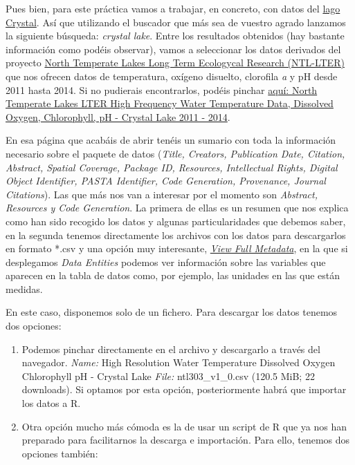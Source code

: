 \documentclass[
]{book}
\providecommand{\tightlist}{%
  \setlength{\itemsep}{0pt}\setlength{\parskip}{0pt}}
\begin{document}
Pues bien, para este práctica vamos a trabajar, en concreto, con datos del \href{https://lter.limnology.wisc.edu/researchsite/crystal-lake}{lago Crystal}.
Así que utilizando el buscador que más sea de vuestro agrado lanzamos la siguiente búsqueda: \emph{crystal lake}.
Entre los resultados obtenidos (hay bastante información como podéis observar), vamos a seleccionar los datos derivados del proyecto \href{https://lter.limnology.wisc.edu/index.php/}{North Temperate Lakes Long Term Ecologycal Research (NTL-LTER)} que nos ofrecen datos de temperatura, oxígeno disuelto, clorofila \emph{a} y pH desde 2011 hasta 2014. Si no pudierais encontrarlos, podéis pinchar \href{https://portal.edirepository.org/nis/mapbrowse?packageid=knb-lter-ntl.303.20}{aquí: North Temperate Lakes LTER High Frequency Water Temperature Data, Dissolved Oxygen, Chlorophyll, pH - Crystal Lake 2011 - 2014}.

En esa página que acabáis de abrir tenéis un sumario con toda la información necesario sobre el paquete de datos (\emph{Title, Creators, Publication Date, Citation, Abstract, Spatial Coverage, Package ID, Resources, Intellectual Rights, Digital Object Identifier, PASTA Identifier, Code Generation, Provenance, Journal Citations}). Las que más nos van a interesar por el momento son \emph{Abstract, Resources y Code Generation}. La primera de ellas es un resumen que nos explica como han sido recogido los datos y algunas particularidades que debemos saber, en la segunda tenemos directamente los archivos con los datos para descargarlos en formato *.csv y una opción muy interesante, \href{https://portal.edirepository.org/nis/metadataviewer?packageid=knb-lter-ntl.303.20}{\emph{View Full Metadata}}, en la que si desplegamos \emph{Data Entities} podemos ver información sobre las variables que aparecen en la tabla de datos como, por ejemplo, las unidades en las que están medidas.

En este caso, disponemos solo de un fichero. Para descargar los datos tenemos dos opciones:

\begin{enumerate}
\def\labelenumi{\arabic{enumi}.}
\tightlist
\item
  Podemos pinchar directamente en el archivo y descargarlo a través del navegador. \emph{Name:} High Resolution Water Temperature Dissolved Oxygen Chlorophyll pH - Crystal Lake \emph{File:} ntl303\_v1\_0.csv (120.5 MiB; 22 downloads). Si optamos por esta opción, posteriormente habrá que importar los datos a R.
\item
  Otra opción mucho más cómoda es la de usar un script de R que ya nos han preparado para facilitarnos la descarga e importación. Para ello, tenemos dos opciones también:
\end{enumerate}
\end{document}

